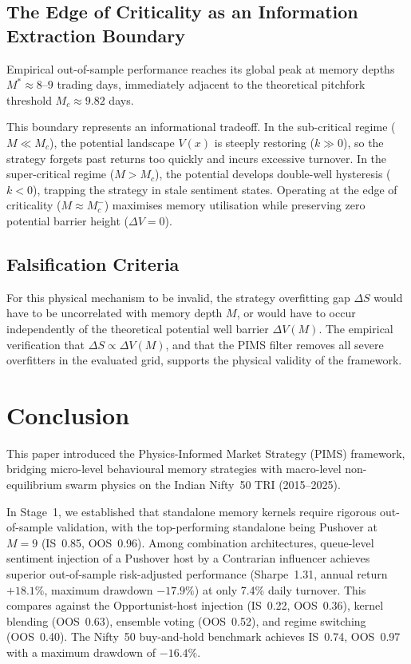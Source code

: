 \documentclass[10pt,twocolumn,twoside,a4paper]{article}
\begin{document}
\subsection{The Edge of Criticality as an Information Extraction Boundary}
Empirical out-of-sample performance reaches its global peak at memory depths $M^*\approx8$--$9$
trading days, immediately adjacent to the theoretical pitchfork threshold $M_c\approx9.82$ days.

This boundary represents an informational tradeoff. In the sub-critical regime ($M\ll M_c$), the
potential landscape $V(x)$ is steeply restoring ($k\gg0$), so the strategy forgets past returns
too quickly and incurs excessive turnover. In the super-critical regime ($M>M_c$), the potential
develops double-well hysteresis ($k<0$), trapping the strategy in stale sentiment states. Operating
at the edge of criticality ($M\approx M_c^-$) maximises memory utilisation while preserving zero
potential barrier height ($\Delta V=0$).

\subsection{Falsification Criteria}
For this physical mechanism to be invalid, the strategy overfitting gap $\Delta S$ would have to
be uncorrelated with memory depth $M$, or would have to occur independently of the theoretical
potential well barrier $\Delta V(M)$. The empirical verification that $\Delta S\propto\Delta V(M)$,
and that the PIMS filter removes all severe overfitters in the evaluated grid, supports the physical
validity of the framework.

\section{Conclusion}

This paper introduced the Physics-Informed Market Strategy (PIMS) framework, bridging micro-level
behavioural memory strategies with macro-level non-equilibrium swarm physics on the Indian Nifty~50
TRI (2015--2025).

In Stage~1, we established that standalone memory kernels require rigorous out-of-sample validation,
with the top-performing standalone being Pushover at $M=9$ (IS~0.85, OOS~0.96). Among combination
architectures, queue-level sentiment injection of a Pushover host by a Contrarian influencer
achieves superior out-of-sample risk-adjusted performance (Sharpe~1.31, annual return $+18.1\%$,
maximum drawdown $-17.9\%$) at only 7.4\% daily turnover. This compares against the Opportunist-host
injection (IS~0.22, OOS~0.36), kernel blending (OOS~0.63), ensemble voting (OOS~0.52), and regime
switching (OOS~0.40). The Nifty~50 buy-and-hold benchmark achieves IS~0.74, OOS~0.97 with a maximum
drawdown of $-16.4\%$.
\end{document}
